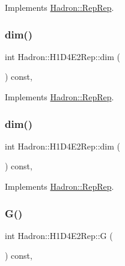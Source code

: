 Implements \mbox{\hyperlink{structHadron_1_1RepRep_a92c8802e5ed7afd7da43ccfd5b7cd92b}{Hadron\+::\+Rep\+Rep}}.

\mbox{\label{structHadron_1_1H1D4E2Rep_a01e217ac021a9f606e9cc27e4c62389e}} 
\subsubsection{\texorpdfstring{dim()}{dim()}\hspace{0.1cm}{\footnotesize\ttfamily [2/3]}}
{\footnotesize\ttfamily int Hadron\+::\+H1\+D4\+E2\+Rep\+::dim (\begin{DoxyParamCaption}{ }\end{DoxyParamCaption}) const\hspace{0.3cm}{\ttfamily [inline]}, {\ttfamily [virtual]}}



Implements \mbox{\hyperlink{structHadron_1_1RepRep_a92c8802e5ed7afd7da43ccfd5b7cd92b}{Hadron\+::\+Rep\+Rep}}.

\mbox{\label{structHadron_1_1H1D4E2Rep_a01e217ac021a9f606e9cc27e4c62389e}} 
\subsubsection{\texorpdfstring{dim()}{dim()}\hspace{0.1cm}{\footnotesize\ttfamily [3/3]}}
{\footnotesize\ttfamily int Hadron\+::\+H1\+D4\+E2\+Rep\+::dim (\begin{DoxyParamCaption}{ }\end{DoxyParamCaption}) const\hspace{0.3cm}{\ttfamily [inline]}, {\ttfamily [virtual]}}



Implements \mbox{\hyperlink{structHadron_1_1RepRep_a92c8802e5ed7afd7da43ccfd5b7cd92b}{Hadron\+::\+Rep\+Rep}}.

\mbox{\label{structHadron_1_1H1D4E2Rep_a89812641dc6e1a2786c442f6bc8775d7}} 
\subsubsection{\texorpdfstring{G()}{G()}\hspace{0.1cm}{\footnotesize\ttfamily [1/2]}}
{\footnotesize\ttfamily int Hadron\+::\+H1\+D4\+E2\+Rep\+::G (\begin{DoxyParamCaption}{ }\end{DoxyParamCaption}) const\hspace{0.3cm}{\ttfamily [inline]}, {\ttfamily [virtual]}}

